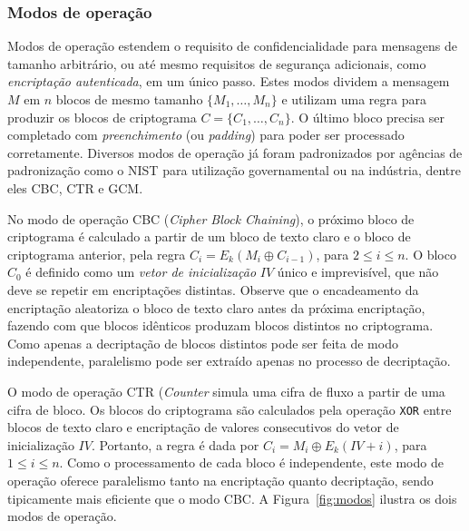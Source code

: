 \subsubsection*{Modos de operação}

Modos de operação estendem o requisito de confidencialidade para mensagens de tamanho arbitrário, ou até mesmo requisitos de segurança adicionais, como \emph{encriptação autenticada}, em um único passo. Estes modos dividem a mensagem $M$ em $n$ blocos de mesmo tamanho $\{M_1, \ldots, M_n\}$ e utilizam uma regra para produzir os blocos de criptograma $C = \{C_1, \ldots, C_n\}$.
O último bloco precisa ser completado com \emph{preenchimento} (ou \emph{padding}) para poder ser processado corretamente.
Diversos modos de operação já foram padronizados por agências de padronização como o NIST para utilização governamental ou na indústria, dentre eles CBC, CTR e GCM.

No modo de operação CBC (\emph{Cipher Block Chaining}), o próximo bloco de criptograma é calculado a partir de um bloco de texto claro e o bloco de criptograma anterior, pela regra $C_i = E_k(M_i \oplus C_{i-1})$, para $2 \leq i \leq n$. O bloco $C_0$ é definido como um \emph{vetor de inicialização} $IV$ único e imprevisível, que não deve se repetir em encriptações distintas. Observe que o encadeamento da encriptação aleatoriza o bloco de texto claro antes da próxima encriptação, fazendo com que blocos idênticos produzam blocos distintos no criptograma. Como apenas a decriptação de blocos distintos pode ser feita de modo independente, paralelismo pode ser extraído apenas no processo de decriptação.

O modo de operação CTR (\emph{Counter} simula uma cifra de fluxo a partir de uma cifra de bloco. Os blocos do criptograma são calculados pela operação \texttt{XOR} entre blocos de texto claro e encriptação de valores consecutivos do vetor de inicialização $IV$. Portanto, a regra é dada por $C_i = M_i \oplus E_k(IV + i)$, para $1 \leq i \leq n$. Como o processamento de cada bloco é independente, este modo de operação oferece paralelismo tanto na encriptação quanto decriptação, sendo tipicamente mais eficiente que o modo CBC. A Figura~\ref{fig:modos} ilustra os dois modos de operação.

